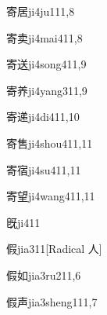 \begin{verbete}{寄居}{ji4ju1}{11,8}
\end{verbete}

\begin{verbete}{寄卖}{ji4mai4}{11,8}
\end{verbete}

\begin{verbete}{寄送}{ji4song4}{11,9}
\end{verbete}

\begin{verbete}{寄养}{ji4yang3}{11,9}
\end{verbete}

\begin{verbete}{寄递}{ji4di4}{11,10}
\end{verbete}

\begin{verbete}{寄售}{ji4shou4}{11,11}
\end{verbete}

\begin{verbete}{寄宿}{ji4su4}{11,11}
\end{verbete}

\begin{verbete}{寄望}{ji4wang4}{11,11}
\end{verbete}

\begin{verbete}{旣}{ji4}{11}
\end{verbete}

\begin{verbete}{假}{jia3}{11}[Radical 人]
\end{verbete}

\begin{verbete}{假如}{jia3ru2}{11,6}
\end{verbete}

\begin{verbete}{假声}{jia3sheng1}{11,7}
\end{verbete}

